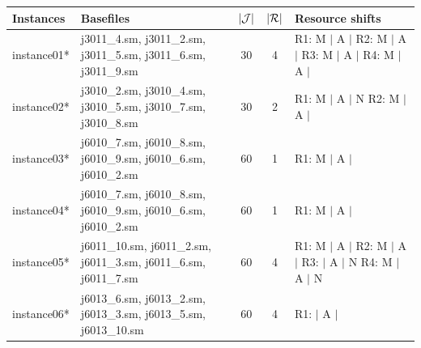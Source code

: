 \begin{table}[p]
    \centering
    \begin{tabularx}{\textwidth}{lXccX}
        \toprule
        \textbf{Instances} & \textbf{Basefiles} & $|\mathcal{J}|$ & $|\mathcal{R}|$ & \textbf{Resource shifts} \\
        \midrule
        instance01* & j3011\_4.sm, j3011\_2.sm, j3011\_5.sm, j3011\_6.sm, j3011\_9.sm
                    & 30
                    & 4 
                    & R1: M $|$ A $|$  \newline
                      R2: M $|$ A $|$  \newline
                      R3: M $|$ A $|$  \newline
                      R4: M $|$ A $|$
                    \\
                    \cmidrule[0.01em](lr){1-5}
        instance02* & j3010\_2.sm, j3010\_4.sm, j3010\_5.sm, j3010\_7.sm, j3010\_8.sm
                    & 30
                    & 2 
                    & R1: M $|$ A $|$ N \newline
                      R2: M $|$ A $|$
                    \\
                    \cmidrule[0.01em](lr){1-5}
        instance03* & j6010\_7.sm, j6010\_8.sm, j6010\_9.sm, j6010\_6.sm, j6010\_2.sm 
                    & 60
                    & 1 
                    & R1: M $|$ A $|$ 
                    \\
                    \cmidrule[0.01em](lr){1-5}
        instance04* & j6010\_7.sm, j6010\_8.sm, j6010\_9.sm, j6010\_6.sm, j6010\_2.sm
                    & 60
                    & 1 
                    & R1: M $|$ A $|$
                    \\
                    \cmidrule[0.01em](lr){1-5}
        instance05* & j6011\_10.sm, j6011\_2.sm, j6011\_3.sm, j6011\_6.sm, j6011\_7.sm
                    & 60
                    & 4 
                    & R1: M $|$ A $|$ \newline
                      R2: M $|$ A $|$ \newline
                      R3: \phantom{M} $|$ A $|$ N \newline
                      R4: M $|$ A $|$ N
                    \\
                    \cmidrule[0.01em](lr){1-5}
        instance06* & j6013\_6.sm, j6013\_2.sm, j6013\_3.sm, j6013\_5.sm, j6013\_10.sm
                    & 60
                    & 4 
                    & R1: \phantom{M} $|$ A $|$ \newline

\end{tabularx}
\end{table}
